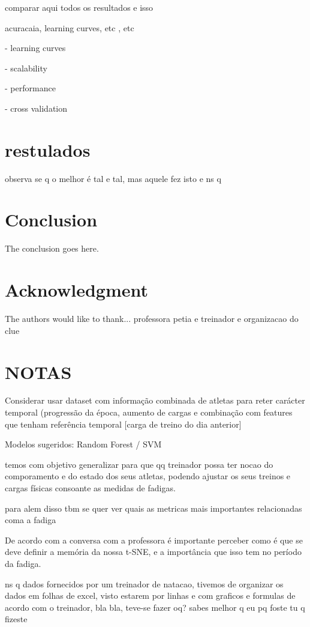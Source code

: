 \documentclass[conference]{IEEEtran}
\begin{document}
comparar aqui todos os resultados e isso

acuracaia, learning curves, etc , etc

- learning curves

- scalability 

- performance 

- cross validation

\section{restulados}

observa se q o melhor é tal e tal, mas aquele fez isto e ns q


\section{Conclusion}

The conclusion goes here.

\section*{Acknowledgment}


The authors would like to thank... professora petia e treinador e organizacao do clue


\section{NOTAS}

Considerar usar dataset com informação combinada de atletas para reter carácter temporal (progressão da época, aumento de cargas e combinação com features que tenham referência temporal [carga de treino do dia anterior]

Modelos sugeridos: Random Forest / SVM

temos com objetivo generalizar para que qq treinador possa ter nocao do comporamento e do estado dos seus atletas, podendo ajustar os seus treinos e cargas físicas consoante as medidas de fadigas.

para alem disso tbm se quer ver quais as metricas mais importantes relacionadas coma a fadiga

De acordo com a conversa com a professora é importante perceber como é que se deve definir a memória da nossa t-SNE, e a importância que isso tem no período da fadiga.

ns q dados fornecidos por um treinador de natacao, tivemos de organizar os dados em folhas de excel, visto estarem por linhas e com graficos e formulas de acordo com o treinador, bla bla, teve-se fazer oq? sabes melhor q eu pq foste tu q fizeste
\end{document}
